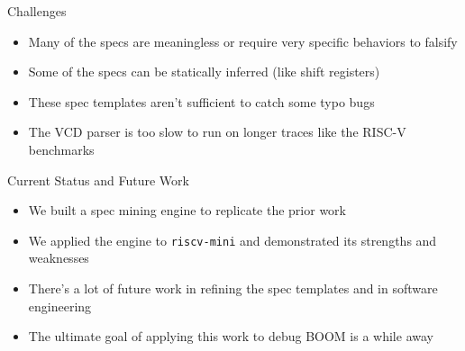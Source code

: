 \documentclass[12pt,aspectratio=169]{beamer}
\begin{document}
\begin{frame}{Challenges}
  \begin{itemize}
    \setlength\itemsep{0.75em}
    \item Many of the specs are meaningless or require very specific behaviors to falsify
    \item Some of the specs can be statically inferred (like shift registers)
    \item These spec templates aren't sufficient to catch some typo bugs
    \item The VCD parser is too slow to run on longer traces like the RISC-V benchmarks
  \end{itemize}
\end{frame}

\begin{frame}{Current Status and Future Work}
  \begin{itemize}
    \setlength\itemsep{0.75em}
    \item We built a spec mining engine to replicate the prior work
    \item We applied the engine to \texttt{riscv-mini} and demonstrated its strengths and weaknesses
    \item There's a lot of future work in refining the spec templates and in software engineering
    \item The ultimate goal of applying this work to debug BOOM is a while away
  \end{itemize}
\end{frame}

\end{document}
